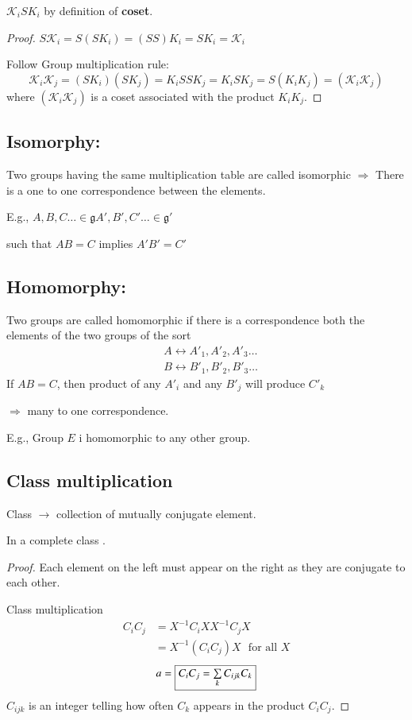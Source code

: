 $\mathcal{K}_{i}SK_{i}$ by definition of {\bf coset}.

\begin{proof}
$S\mathcal{K}_{i}=S(SK_{i})=(SS)K_{i}=SK_{i}=\mathcal{K}_{i}$

Follow Group multiplication rule:
$$
\mathcal{K}_{i}\mathcal{K}_{j}=(SK_{i})(SK_{j})=K_{i}SSK_{j}=K_{i}SK_{j}=S(K_{i}K_{j})=(\mathcal{K}_{i}\mathcal{K}_{j})
$$
where $(\mathcal{K}_{i}\mathcal{K}_{j})$ is a coset associated with the product $K_{i}K_{j}$.
\end{proof}

\subsection*{Isomorphy:}

Two groups having the same multiplication table are called isomorphic $\Rightarrow$ There is a one to one correspondence between the elements.

E.g., $A,B,C\ldots \in \mathfrak{g}$\quad $A',B',C'\ldots \in \mathfrak{g}'$

such that $AB=C$ implies $A'B'=C'$

\subsection*{Homomorphy:}

Two groups are called homomorphic if there is a correspondence both the elements of the two groups of the sort
\begin{align*}
& A\leftrightarrow A'_{1},A'_{2},A'_{3}\ldots\\
& B\leftrightarrow B'_{1},B'_{2},B'_{3}\ldots
\end{align*}
If $AB=C$, then product of any $A'_{i}$ and any $B'_{j}$ will produce $C'_{k}$

$\Rightarrow$ many to one correspondence.

E.g., Group $E$ i homomorphic to any other group.

\subsection*{Class multiplication}

Class $\to$ collection of mutually conjugate element.

In a complete class .

\begin{proof}
Each element on the left must appear on the right as they are conjugate to each other.

Class multiplication
\begin{align*}
C_{i}C_{j} &= X^{-1}C_{i}XX^{-1}C_{j}X\\
         &= X^{-1}(C_{i}C_{j})X\text{~ for all } X
\end{align*}
$$
a= \fbox{$C_{i}C_{j}=\sum\limits_{k}C_{ijk}C_{k}$}
$$
$C_{ijk}$ is an integer telling how often $C_{k}$ appears in the product $C_{i}C_{j}$.
\end{proof}

